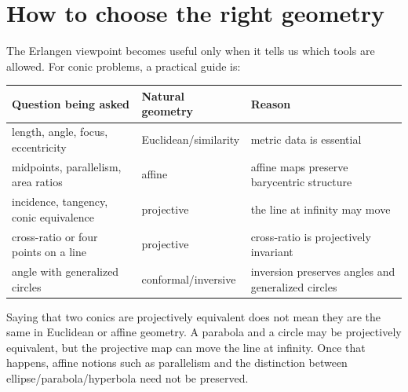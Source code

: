 \section{How to choose the right geometry}

The Erlangen viewpoint becomes useful only when it tells us which tools are allowed.  For conic problems, a practical guide is:

\begin{center}
\small
\begin{tabularx}{\textwidth}{@{}lYY@{}}
\toprule
Question being asked & Natural geometry & Reason\\
\midrule
length, angle, focus, eccentricity & Euclidean/similarity & metric data is essential\\
midpoints, parallelism, area ratios & affine & affine maps preserve barycentric structure\\
incidence, tangency, conic equivalence & projective & the line at infinity may move\\
cross-ratio or four points on a line & projective & cross-ratio is projectively invariant\\
angle with generalized circles & conformal/inversive & inversion preserves angles and generalized circles\\
\bottomrule
\end{tabularx}
\end{center}

\begin{remark}
Saying that two conics are projectively equivalent does not mean they are the same in Euclidean or affine geometry.  A parabola and a circle may be projectively equivalent, but the projective map can move the line at infinity.  Once that happens, affine notions such as parallelism and the distinction between ellipse/parabola/hyperbola need not be preserved.
\end{remark}
